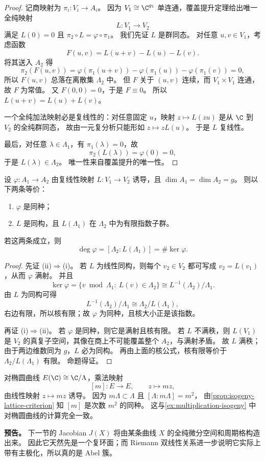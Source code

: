 \begin{proof}
记商映射为 $\pi_i:V_i\to A_i$。
因为 $V_1\cong \C^{g_1}$ 单连通，覆盖提升定理给出唯一全纯映射
\[
  L:V_1\to V_2
\]
满足 $L(0)=0$ 且 $\pi_2\circ L=\varphi\circ\pi_1$。
我们先证 $L$ 是群同态。
对任意 $u,v\in V_1$，考虑函数
\[
  F(u,v)=L(u+v)-L(u)-L(v).
\]
将其送入 $A_2$ 得
\[
  \pi_2(F(u,v))
  =\varphi(\pi_1(u+v))-
    \varphi(\pi_1(u))-
    \varphi(\pi_1(v))=0,
\]
所以 $F(u,v)$ 总落在离散集 $\Lambda_2$ 中。
但 $F$ 关于 $(u,v)$ 连续，而 $V_1\times V_1$ 连通，故 $F$ 为常值。
又 $F(0,0)=0$，于是 $F\equiv 0$。
所以 $L(u+v)=L(u)+L(v)$。

一个全纯加法映射必是复线性的：对任意固定 $u$，映射 $z\mapsto L(zu)$ 是从 $\C$ 到 $V_2$ 的全纯群同态，
故由一元复分析只能形如 $z\mapsto zL(u)$。
于是 $L$ 复线性。

最后，对任意 $\lambda\in\Lambda_1$，有 $\pi_1(\lambda)=0$，故
\[
  \pi_2(L(\lambda))=\varphi(0)=0,
\]
于是 $L(\lambda)\in\Lambda_2$。
唯一性来自覆盖提升的唯一性。
\end{proof}

\begin{proposition}[同种的格判别]
\label{prop:isogeny-lattice-criterion}
设 $\varphi:A_1\to A_2$ 由复线性映射 $L:V_1\to V_2$ 诱导，且 $\dim A_1=\dim A_2=g$。
则以下两条等价：
\begin{enumerate}
  \item[(i)] $\varphi$ 是同种；
  \item[(ii)] $L$ 是同构，且 $L(\Lambda_1)$ 在 $\Lambda_2$ 中为有限指数子群。
\end{enumerate}
若这两条成立，则
\[
  \deg \varphi=[\Lambda_2:L(\Lambda_1)]=\#\ker\varphi.
\]
\end{proposition}

\begin{proof}
先证 (ii)$\Rightarrow$(i)。
若 $L$ 为线性同构，则每个 $v_2\in V_2$ 都可写成 $v_2=L(v_1)$，从而 $\varphi$ 满射。
并且
\[
  \ker\varphi
  =\{v\bmod \Lambda_1:\ L(v)\in\Lambda_2\}
  \cong L^{-1}(\Lambda_2)/\Lambda_1.
\]
由 $L$ 为同构可得
\[
  L^{-1}(\Lambda_2)/\Lambda_1\cong \Lambda_2/L(\Lambda_1),
\]
右边有限，所以核有限；故 $\varphi$ 为同种，且核大小正是该指数。

再证 (i)$\Rightarrow$(ii)。
若 $\varphi$ 是同种，则它是满射且核有限。
若 $L$ 不满秩，则 $L(V_1)$ 是 $V_2$ 的真复子空间，其像在商上不可能覆盖整个 $A_2$，与满射矛盾。
故 $L$ 满秩；由于两边维数同为 $g$，$L$ 必为同构。
再由上面的核公式，核有限等价于 $\Lambda_2/L(\Lambda_1)$ 有限。
命题得证。
\end{proof}

\begin{example}
\label{ex:elliptic-as-abelian}
对椭圆曲线 $E(\C)\cong \C/\Lambda$，乘法映射
\[
  [m]:E\to E,
  \qquad z\longmapsto mz,
\]
由线性映射 $z\mapsto mz$ 诱导。
因为 $m\Lambda\subset \Lambda$ 且 $[\Lambda:m\Lambda]=m^2$，
由\cref{prop:isogeny-lattice-criterion} 知 $[m]$ 是次数 $m^2$ 的同种。
这与\cref{ex:multiplication-isogeny} 中对椭圆曲线的计算完全一致。
\end{example}

\textbf{预告。}
下一节的 Jacobian $J(X)$ 将由某条曲线 $X$ 的全纯微分空间和周期格构造出来。
因此它天然先是一个复环面；而 Riemann 双线性关系进一步说明它实际上带有主极化，所以真的是 Abel 簇。
